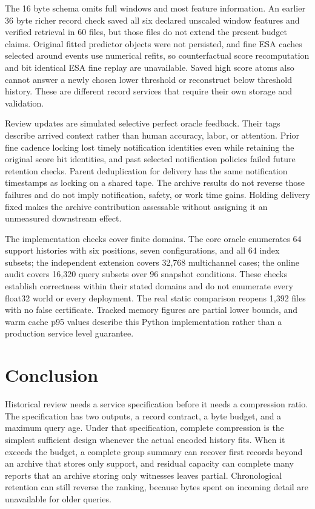\documentclass[a4paper,fleqn]{cas-dc}
\begin{document}
The 16 byte schema omits full windows and most feature information. An earlier 36 byte richer record check saved all six declared unscaled window features and verified retrieval in 60 files, but those files do not extend the present budget claims. Original fitted predictor objects were not persisted, and fine ESA caches selected around events use numerical refits, so counterfactual score recomputation and bit identical ESA fine replay are unavailable. Saved high score atoms also cannot answer a newly chosen lower threshold or reconstruct below threshold history. These are different record services that require their own storage and validation.

Review updates are simulated selective perfect oracle feedback. Their tags describe arrived context rather than human accuracy, labor, or attention. Prior fine cadence locking lost timely notification identities even while retaining the original score hit identities, and past selected notification policies failed future retention checks. Parent deduplication for delivery has the same notification timestamps as locking on a shared tape. The archive results do not reverse those failures and do not imply notification, safety, or work time gains. Holding delivery fixed makes the archive contribution assessable without assigning it an unmeasured downstream effect.

The implementation checks cover finite domains. The core oracle enumerates 64 support histories with six positions, seven configurations, and all 64 index subsets; the independent extension covers 32,768 multichannel cases; the online audit covers 16,320 query subsets over 96 snapshot conditions. These checks establish correctness within their stated domains and do not enumerate every float32 world or every deployment. The real static comparison reopens 1,392 files with no false certificate. Tracked memory figures are partial lower bounds, and warm cache p95 values describe this Python implementation rather than a production service level guarantee.

\section{Conclusion}\label{sec:conclusion}

Historical review needs a service specification before it needs a compression ratio. The specification has two outputs, a record contract, a byte budget, and a maximum query age. Under that specification, complete compression is the simplest sufficient design whenever the actual encoded history fits. When it exceeds the budget, a complete group summary can recover first records beyond an archive that stores only support, and residual capacity can complete many reports that an archive storing only witnesses leaves partial. Chronological retention can still reverse the ranking, because bytes spent on incoming detail are unavailable for older queries.
\end{document}
